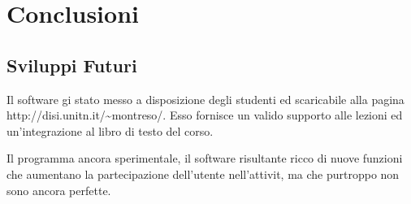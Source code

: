 %
\chapter{Conclusioni}


\section{Sviluppi Futuri}

Il software  gi stato messo a disposizione degli studenti ed  scaricabile
alla pagina http://disi.unitn.it/\textasciitilde{}montreso/. Esso
fornisce un valido supporto alle lezioni ed un'integrazione al libro
di testo del corso.

Il programma  ancora sperimentale, il software risultante  ricco
di nuove funzioni che aumentano la partecipazione dell'utente nell'attivit,
ma che purtroppo non sono ancora perfette.

